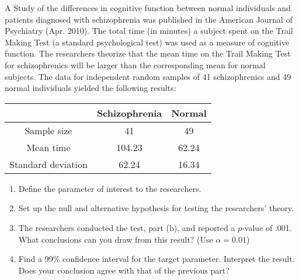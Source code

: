 
\begin{exercise}

A Study of the differences in cognitive function between normal
individuals and patients diagnosed with schizophrenia was published
in the American Journal of Psychiatry (Apr. 2010). The total time
(in minutes) a subject spent on the Trail Making Test (a standard
psychological test) was used as a measure of cognitive function.
The researchers theorize that the mean time on the Trail Making Test
for schizophrenics will be larger than the corresponding mean for normal
subjects. The data for independent random samples of 41 schizophrenics
and 49 normal individuals yielded the following results:

\begin{center}
\begin{tabular}{c|cc}
    & Schizophrenia & Normal \\
    \hline
    Sample size & 41 & 49 \\
    Mean time & 104.23 & 62.24 \\
    Standard deviation & 62.24 & 16.34
\end{tabular}
\end{center}

\begin{enumerate}[label = (\alph*)]
    \item Define the parameter of interest to the researchers.
    \item Set up the null and alternative hypothesis for testing
    the researchers' theory.
    \item The researchers conducted the test, part (b), and reported a
    $p$-value of .001. What conclusions can you draw from this result?
    (Use $\alpha = 0.01$)
    \item Find a 99\% confidence interval for the target parameter.
    Interpret the result. Does your conclusion agree with that
    of the previous part?
\end{enumerate}

\end{exercise}


\begin{solution}

\phantom{}

\end{solution}

